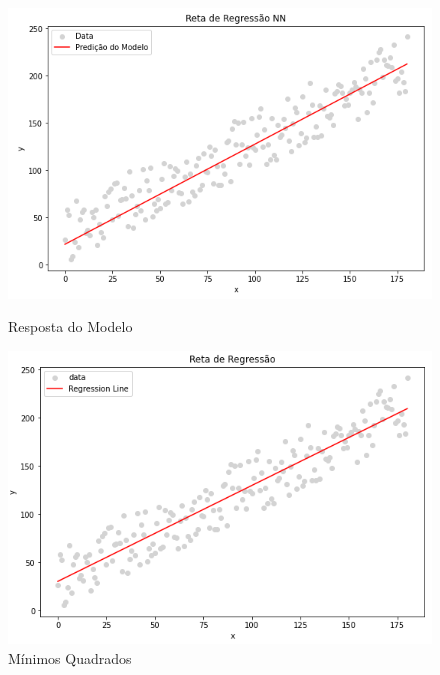 \documentclass[12pt,openright,openany,oneside,article,a4paper,brazi]{abntex2}
\begin{document}
\begin{figure}[!htb]
  \begin{minipage}[!]{0.51\linewidth}
  \begin{center}
  \end{center}
  \includegraphics[scale=0.57]{regression_NN.PNG}
  \caption{Resposta do Modelo}
  \label{fig:}
  \end{minipage}
  \begin{minipage}[!]{0.51\linewidth}
  \begin{center}
  \end{center}
  \includegraphics[scale=0.57]{regression_MQ.PNG}
  \caption{Mínimos Quadrados}
  \label{fig:}
  \end{minipage}
\end{figure}
\end{document}
